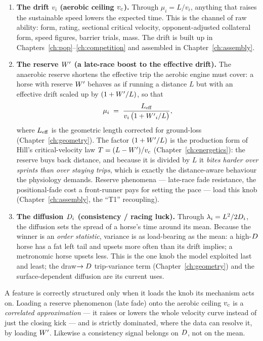 \begin{enumerate}[label=\textbf{Knob \arabic*.},leftmargin=*]
  \item \textbf{The drift $v_i$ (aerobic ceiling ${v_{c}}$).} Through $\mu_i=L/v_i$, anything that
        raises the sustainable speed lowers the expected time. This is the channel of raw ability:
        form, rating, sectional critical velocity, opponent-adjusted collateral form, speed
        figures, barrier trials, mass. The drift is built up in
        Chapters~\ref{ch:pop}--\ref{ch:competition} and assembled in Chapter~\ref{ch:assembly}.
  \item \textbf{The reserve ${W^{\prime}}$ (a late-race boost to the effective drift).} The anaerobic
        reserve shortens the effective trip the aerobic engine must cover: a horse with reserve
        ${W^{\prime}}$ behaves as if running a distance $L$ but with an effective drift scaled up by
        $(1+{W^{\prime}}/L)$, so that
        \begin{equation}
          \mu_i \;=\; \frac{{L_{\mathrm{eff}}}}{v_i\,\bigl(1+{W^{\prime}}_i/L\bigr)},
          \label{eq:mu-wprime}
        \end{equation}
        where ${L_{\mathrm{eff}}}$ is the geometric length corrected for ground-loss (Chapter~\ref{ch:geometry}).
        The factor $(1+{W^{\prime}}/L)$ is the production form of Hill's critical-velocity law
        $T=(L-{W^{\prime}})/v_c$ (Chapter~\ref{ch:energetics}): the reserve buys back distance, and
        because it is divided by $L$ it \emph{bites harder over sprints than over staying trips},
        which is exactly the distance-aware behaviour the physiology demands. Reserve phenomena
        --- late-race fade resistance, the positional-fade cost a front-runner pays for setting
        the pace --- load this knob (Chapter~\ref{ch:assembly}, the ``T1'' recoupling).
  \item \textbf{The diffusion $D_i$ (consistency / racing luck).} Through
        $\lambda_i=L^2/2D_i$, the diffusion sets the spread of a horse's time around its
        mean. Because the winner is an \emph{order statistic}, variance is as load-bearing as the
        mean: a high-$D$ horse has a fat left tail and upsets more often than its drift
        implies; a metronomic horse upsets less. This is the one knob the model exploited last and
        least; the draw$\to D$ trip-variance term (Chapter~\ref{ch:geometry}) and the
        surface-dependent diffusion are its current uses.
\end{enumerate}

\begin{principle}
A feature is correctly structured only when it loads the knob its mechanism acts on. Loading a
reserve phenomenon (late fade) onto the aerobic ceiling ${v_{c}}$ is a \emph{correlated
approximation} --- it raises or lowers the whole velocity curve instead of just the closing kick
--- and is strictly dominated, where the data can resolve it, by loading ${W^{\prime}}$. Likewise a
consistency signal belongs on $D$, not on the mean.
\end{principle}

